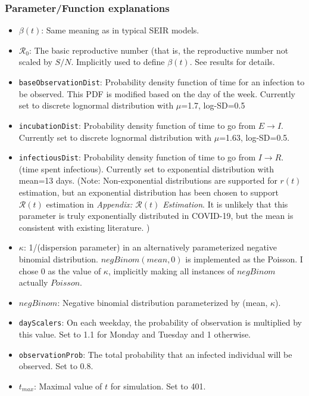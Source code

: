 \documentclass{article}
\newcommand{\nR}{\mathcal{R}}
\newcommand{\code}[1]{\texttt{#1}}
\begin{document}
\subsubsection{Parameter/Function explanations}
\begin{itemize}
    \item $\beta(t)$: Same meaning as in typical SEIR models. 
    \item $\nR_0$: The basic reproductive number (that is, the reproductive number not scaled by $S/N$. Implicitly used to define $\beta(t)$. See results for details.
    \item \code{baseObservationDist}: Probability density function of time for an infection to be observed. This PDF is modified based on the day of the week. Currently set to discrete lognormal distribution with $\mu$=1.7, log-SD=0.5 
    \item \code{incubationDist}: Probability density function of time to go from $E \rightarrow I$. Currently set to discrete lognormal distribution with $\mu$=1.63, log-SD=0.5. \cite{McAloon}
    \item \code{infectiousDist}: Probability density function of time to go from $I \rightarrow R$. (time spent infectious). Currently set to exponential distribution with mean=13 days. (Note: Non-exponential distributions are supported for $r(t)$ estimation, but an exponential distribution has been chosen to support $\nR(t)$ estimation in \emph{Appendix: $\nR(t)$ Estimation}. It is unlikely that this parameter is truly exponentially distributed in COVID-19, but the mean is consistent with existing literature. \cite{infectiousperiod})
    \item $\kappa$: 1/(dispersion parameter) in an alternatively parameterized negative binomial distribution. \cite{NegBinom} $negBinom(mean, 0)$ is implemented as the Poisson. I chose 0 as the value of $\kappa$, implicitly making all instances of $negBinom$ actually $Poisson$.
    \item $negBinom$: Negative binomial distribution parameterized by (mean, $\kappa$). 
    \item \code{dayScalers}: On each weekday, the probability of observation is multiplied by this value. Set to 1.1 for Monday and Tuesday and 1 otherwise. 
    \item \code{observationProb}: The total probability that an infected individual will be observed. Set to 0.8.
    \item $t_{max}$: Maximal value of $t$ for simulation. Set to 401.
\end{itemize}
\end{document}
